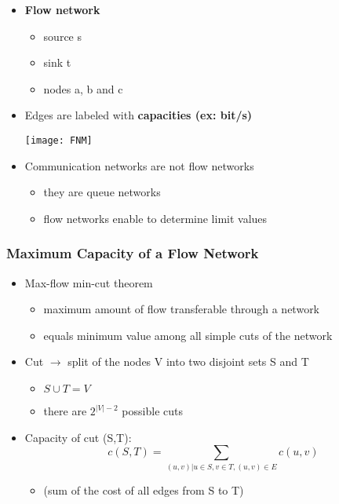 \documentclass[../resumosRCOM.tex]{subfiles}
\begin{document}
\begin{itemize}
    \item \textbf{Flow network}
    \begin{itemize}
        \item source s
        \item sink t
        \item nodes a, b and c
    \end{itemize}
    \item Edges are labeled with \textbf{capacities (ex: bit/s)}
    \begin{center}
        \texttt{[image: FNM]}
    \end{center}
    \item Communication networks are not flow networks
    \begin{itemize}
        \item they are queue networks
        \item flow networks enable to determine limit values
    \end{itemize}
\end{itemize}

\subsubsection{Maximum Capacity of a Flow Network}

\begin{itemize}
    \item Max-flow min-cut theorem
    \begin{itemize}
        \item maximum amount of flow transferable through a network
        \item equals minimum value among all simple cuts of the network
    \end{itemize}
    \item Cut $\rightarrow$ split of the nodes V into two disjoint sets S and T
    \begin{itemize}
        \item $S \cup T = V$
        \item there are $2^{|V|-2}$ possible cuts
    \end{itemize}
    \item Capacity of cut (S,T): \[c(S,T)=\sum_{(u,v) | u\in S,v\in T,(u,v)\in E}c(u,v)\]
    \begin{itemize}
        \item (sum of the cost of all edges from S to T)
    \end{itemize}
\end{itemize}
\end{document}
